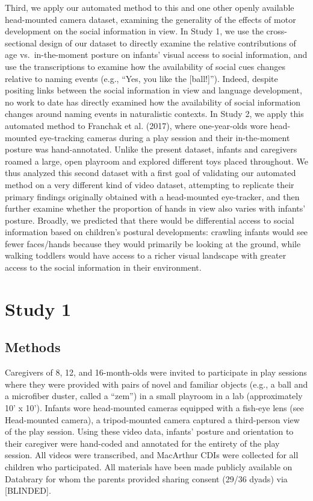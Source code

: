 \documentclass[english,man]{apa6}
\begin{document}
Third, we apply our automated method to this and one other openly
available head-mounted camera dataset, examining the generality of the
effects of motor development on the social information in view. In Study
1, we use the cross-sectional design of our dataset to directly examine
the relative contributions of age vs.~in-the-moment posture on infants'
visual access to social information, and use the transcriptions to
examine how the availability of social cues changes relative to naming
events (e.g., \enquote{Yes, you like the {[}ball!{]}}). Indeed, despite
positing links between the social information in view and language
development, no work to date has directly examined how the availability
of social information changes around naming events in naturalistic
contexts. In Study 2, we apply this automated method to Franchak et al.
(2017), where one-year-olds wore head-mounted eye-tracking cameras
during a play session and their in-the-moment posture was
hand-annotated. Unlike the present dataset, infants and caregivers
roamed a large, open playroom and explored different toys placed
throughout. We thus analyzed this second dataset with a first goal of
validating our automated method on a very different kind of video
dataset, attempting to replicate their primary findings originally
obtained with a head-mounted eye-tracker, and then further examine
whether the proportion of hands in view also varies with infants'
posture. Broadly, we predicted that there would be differential access
to social information based on children's postural developments:
crawling infants would see fewer faces/hands because they would
primarily be looking at the ground, while walking toddlers would have
access to a richer visual landscape with greater access to the social
information in their environment.

\section{Study 1}\label{study-1}

\subsection{Methods}\label{methods}

Caregivers of 8, 12, and 16-month-olds were invited to participate in
play sessions where they were provided with pairs of novel and familiar
objects (e.g., a ball and a microfiber duster, called a \enquote{zem})
in a small playroom in a lab (approximately 10' x 10'). Infants wore
head-mounted cameras equipped with a fish-eye lens (see Head-mounted
camera), a tripod-mounted camera captured a third-person view of the
play session. Using these video data, infants' posture and orientation
to their caregiver were hand-coded and annotated for the entirety of the
play session. All videos were transcribed, and MacArthur CDIs were
collected for all children who participated. All materials have been
made publicly available on Databrary for whom the parents provided
sharing consent (29/36 dyads) via {[}BLINDED{]}.
\end{document}
